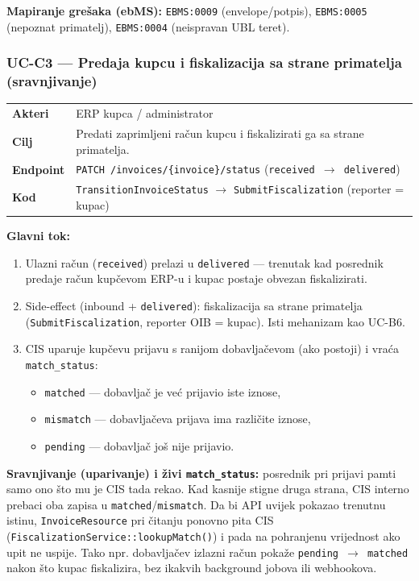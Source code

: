 \documentclass[11pt,a4paper]{article}
\begin{document}
\textbf{Mapiranje grešaka (ebMS):} \texttt{EBMS:0009} (envelope/potpis), \texttt{EBMS:0005} (nepoznat primatelj),
\texttt{EBMS:0004} (neispravan UBL teret).

\subsubsection{UC-C3 — Predaja kupcu i fiskalizacija sa strane primatelja (sravnjivanje)}

\begin{tabularx}{\textwidth}{@{}lY@{}}
\toprule
\textbf{Akteri} & ERP kupca / administrator \\
\textbf{Cilj} & Predati zaprimljeni račun kupcu i fiskalizirati ga sa strane primatelja. \\
\textbf{Endpoint} & \texttt{PATCH /invoices/\{invoice\}/status} (\texttt{received $\rightarrow$ delivered}) \\
\textbf{Kod} & \texttt{TransitionInvoiceStatus} $\rightarrow$ \texttt{SubmitFiscalization} (reporter = kupac) \\
\bottomrule
\end{tabularx}

\textbf{Glavni tok:}
\begin{enumerate}[nosep]
  \item Ulazni račun (\texttt{received}) prelazi u \texttt{delivered} — trenutak kad posrednik predaje
        račun kupčevom ERP-u i kupac postaje obvezan fiskalizirati.
  \item Side-effect (inbound + \texttt{delivered}): fiskalizacija sa strane primatelja
        (\texttt{SubmitFiscalization}, reporter OIB = kupac). Isti mehanizam kao UC-B6.
  \item CIS uparuje kupčevu prijavu s ranijom dobavljačevom (ako postoji) i vraća \texttt{match\_status}:
    \begin{itemize}[nosep]
      \item \texttt{matched} — dobavljač je već prijavio iste iznose,
      \item \texttt{mismatch} — dobavljačeva prijava ima različite iznose,
      \item \texttt{pending} — dobavljač još nije prijavio.
    \end{itemize}
\end{enumerate}

\textbf{Sravnjivanje (uparivanje) i živi \texttt{match\_status}:} posrednik pri prijavi pamti samo ono
što mu je CIS tada rekao. Kad kasnije stigne druga strana, CIS interno prebaci oba zapisa u
\texttt{matched}/\texttt{mismatch}. Da bi API uvijek pokazao trenutnu istinu, \texttt{InvoiceResource} pri
čitanju ponovno pita CIS (\texttt{FiscalizationService::lookupMatch()}) i pada na pohranjenu
vrijednost ako upit ne uspije. Tako npr. dobavljačev izlazni račun pokaže \texttt{pending $\rightarrow$ matched}
nakon što kupac fiskalizira, bez ikakvih background jobova ili webhookova.
\end{document}
